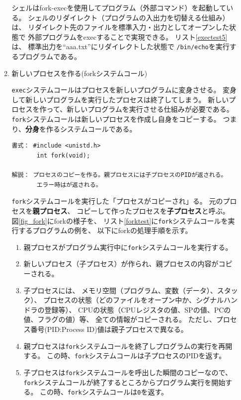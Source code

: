 \documentclass[a4j,dvipdfmx]{jarticle}
\begin{document}
\begin{enumerate}
\begin{enumerate}
シェルはfork-execを使用してプログラム（外部コマンド）を起動している。
シェルのリダイレクト（プログラムの入出力を切替える仕組み）は、
リダイレクト先のファイルを標準入力・出力としてオープンした状態で
外部プログラムをexecすることで実現できる。
リスト\ref{exectest5}は、
標準出力を``aaa.txt''にリダイレクトした状態で
\verb;/bin/echo;を実行するプログラムである。



\item 新しいプロセスを作る(forkシステムコール)

\verb/exec/システムコールはプロセスを新しいプログラムに変身させる。
変身して新しいプログラムを実行したプロセスは終了してしまう。
新しいプロセスを作って、新しいプログラムを実行させる仕組みが必要である。
\verb/fork/システムコールは新しいプロセスを作成し自身をコピーする。
つまり、{\bf 分身}を作るシステムコールである。

\begin{lstlisting}[numbers=none]
書式： #include <unistd.h>
       int fork(void);

解説： プロセスのコピーを作る。親プロセスには子プロセスのPIDが返される。
       エラー時はが返される。
\end{lstlisting}

\verb/fork/システムコールを実行した「プロセスがコピーされ」る。
元のプロセスを{\bf 親プロセス}、
コピーして作ったプロセスを{\bf 子プロセス}と呼ぶ。
図\ref{fig_fork}にforkの様子を、
リスト\ref{forktest}に\verb/fork/システムコールを実行するプログラムの例を、
以下にforkの処理手順を示す。

\begin{enumerate}
\item 親プロセスがプログラム実行中に\verb/fork/システムコールを実行する。
\item 新しいプロセス（子プロセス）が作られ、親プロセスの内容がコピーされる。
\item 子プロセスには、
メモリ空間（プログラム、変数（データ）、スタック）、
プロセスの状態（どのファイルをオープン中か、シグナルハンドラの登録等）、
CPUの状態（CPUレジスタの値、SPの値、PCの値、フラグの値）等、
全ての情報がコピーされる。
ただし、プロセス番号(PID:Process ID)値は親子プロセスで異なる。
\item 親プロセスは\verb/fork/システムコールを終了しプログラムの実行を再開する。
この時、\verb/fork/システムコールは子プロセスのPIDを返す。
\item 子プロセスは\verb/fork/システムコールを呼出した瞬間のコピーなので、
\verb/fork/システムコールが終了するところからプログラム実行を開始する。
この時、\verb/fork/システムコールは\verb/0/を返す。
\end{enumerate}


\end{enumerate}
\end{enumerate}
\end{document}
